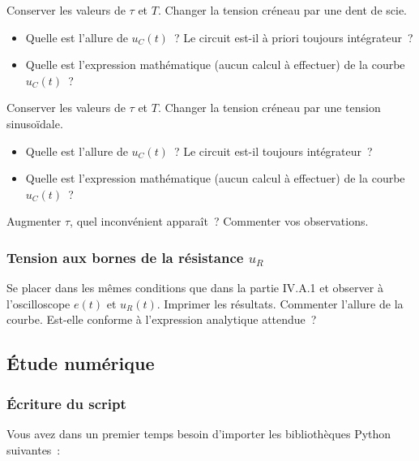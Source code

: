 \documentclass[a4paper, 11pt, final, garamond]{book}
\begin{document}
\medskip

Conserver les valeurs de $\tau$ et $T$. Changer la tension créneau par une dent
de scie.

\medskip

\begin{itemize}
    \item Quelle est l'allure de $u_{C}(t)$~? Le circuit est-il à priori
        toujours intégrateur~?
    \item Quelle est l'expression mathématique (aucun calcul à effectuer) de la
        courbe $u_{C}(t)$~?
\end{itemize}

 \medskip

Conserver les valeurs de $\tau$ et $T$. Changer la tension créneau par une
tension sinusoïdale.

\medskip

\begin{itemize}
    \item Quelle est l'allure de $u_{C}(t)$~? Le circuit est-il toujours
        intégrateur~?
    \item Quelle est l'expression mathématique (aucun calcul à effectuer) de la
        courbe $u_{C}(t)$~?
\end{itemize}

\medskip

Augmenter $\tau$, quel inconvénient apparaît~? Commenter vos observations.

\subsubsection{Tension aux bornes de la résistance $u_R$}

Se placer dans les mêmes conditions que dans la partie IV.A.1 et observer à
l'oscilloscope $e(t)$ et $u_{R}(t)$. Imprimer les résultats. Commenter l'allure
de la courbe. Est-elle conforme à l'expression analytique attendue~?

\subsection{Étude numérique}

\subsubsection{Écriture du script}

Vous avez dans un premier temps besoin d'importer les bibliothèques Python
suivantes~:
\end{document}
